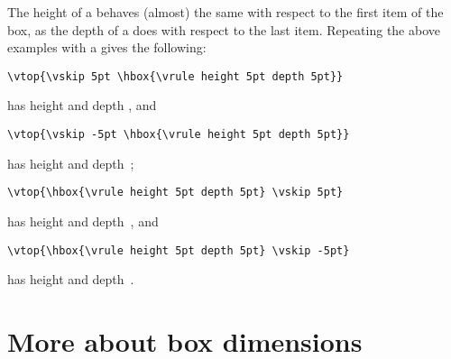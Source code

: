 \documentclass{book}
\begin{document}
The height of a  behaves (almost) the same with respect to
the first item of the box, as the depth of a  does
with respect to the last item. Repeating the above examples with
a  gives the following:
\begin{verbatim}
\vtop{\vskip 5pt \hbox{\vrule height 5pt depth 5pt}}
\end{verbatim}
has height \n{0pt} and depth \n{15pt},
and
\begin{verbatim}
\vtop{\vskip -5pt \hbox{\vrule height 5pt depth 5pt}}
\end{verbatim}
has height \n{0pt} and depth~\n{5pt};
\begin{verbatim}
\vtop{\hbox{\vrule height 5pt depth 5pt} \vskip 5pt}
\end{verbatim}
has height \n{5pt} and depth~\n{10pt}, and
\begin{verbatim}
\vtop{\hbox{\vrule height 5pt depth 5pt} \vskip -5pt}
\end{verbatim}
has height \n{5pt} and depth~\n{0pt}.

\section{More about box dimensions}
\end{document}
